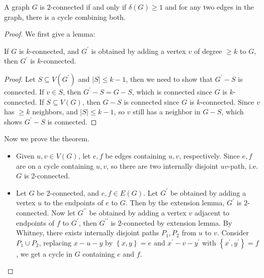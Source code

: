 \begin{theorem}
    A graph \(G\) is \(2\)-connected if and only if \(\delta (G) \ge 1\) and for any two edges in the graph, there is a cycle combining both.   
\end{theorem}
\begin{proof}
    We first give a lemma:
    \begin{lemma}
        If \(G\) is \(k\)-connected, and \(G^{\prime}\) is obtained by adding a vertex \(v\) of degree \(\ge k\) to \(G\), then \(G^{\prime} \) is \(k\)-connected.        
    \end{lemma}

    \begin{proof}
        Let \(S \subseteq V (G^{\prime})\) and \(\vert S \vert \le k - 1\), then we need to show that \(G^{\prime} - S\) is connected. If \(v \in S\), then \(G^{\prime} - S = G - S\), which is connected since \(G\) is \(k\)-connected. If \(S \subseteq V(G)\), then \(G - S\) is connected since \(G\) is \(k\)-connected. Since \(v\) has \(\ge k\) neighbors, and \(\vert S \vert \le k - 1 \), so \(v\) still has a neighbor in \(G - S\), which shows \(G^{\prime} - S\) is connected.               
    \end{proof}

    Now we prove the theorem.

    \begin{itemize}
        \item [\((\impliedby)\)] Given \(u, v \in V(G)\), let \(e, f\) be edges containing \(u, v\), respectively. Since \(e, f\) are on a cycle containing \(u, v\), so there are two internally disjoint \(uv\)-path, i.e. \(G\) is 2-connected. 
        \item [\((\implies)\)] Let \(G\) be 2-connected, and \(e, f \in E(G)\). Let \(G^{\prime}\) be obtained by adding a vertex \(u\) to the endpoints of \(e\) to \(G\). Then by the extension lemma, \(G^{\prime}\) is \(2\)-connected. Now let \(G^{\prime\prime}\) be obtained by adding a vertex \(v\) adjacent to endpoints of \(f\) to \(G^{\prime}\), then \(G^{\prime\prime} \) is \(2\)-connected by extension lemma. By Whitney, there exists internally disjoint paths \(P_1, P_2\) from \(u\) to \(v\). Consider \(P_1 \cup P_2\), replacing \(x-u-y\) by \(\left\{ x, y \right\} = e \) and \(x^{\prime} - v - y^{\prime}\) with \(\left\{ x^{\prime} , y^{\prime}  \right\} = f \), we get a cycle in \(G\) containing \(e\) and \(f\). 
        
        \begin{center}
\end{center}
\end{itemize}
\end{proof}

